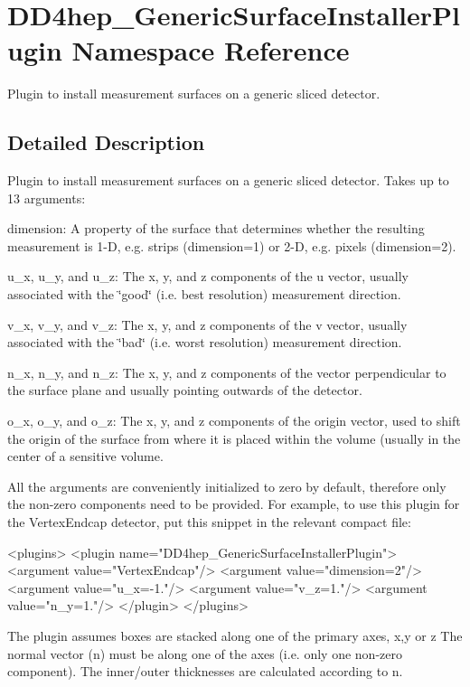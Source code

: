 \hypertarget{namespace_d_d4hep___generic_surface_installer_plugin}{
\section{DD4hep\_\-GenericSurfaceInstallerPlugin Namespace Reference}
\label{namespace_d_d4hep___generic_surface_installer_plugin}
}


Plugin to install measurement surfaces on a generic sliced detector.  


\subsection{Detailed Description}
Plugin to install measurement surfaces on a generic sliced detector. Takes up to 13 arguments:
\begin{DoxyItemize}
\item {\ttfamily dimension:} A property of the surface that determines whether the resulting measurement is 1-\/D, e.g. strips ({\ttfamily dimension=1}) or 2-\/D, e.g. pixels ({\ttfamily dimension=2}).
\item {\ttfamily u\_\-x}, {\ttfamily u\_\-y}, and {\ttfamily u\_\-z:} The x, y, and z components of the u vector, usually associated with the \char`\"{}good\char`\"{} (i.e. best resolution) measurement direction.
\item {\ttfamily v\_\-x}, {\ttfamily v\_\-y}, and {\ttfamily v\_\-z:} The x, y, and z components of the v vector, usually associated with the \char`\"{}bad\char`\"{} (i.e. worst resolution) measurement direction.
\item {\ttfamily n\_\-x}, {\ttfamily n\_\-y}, and {\ttfamily n\_\-z:} The x, y, and z components of the vector perpendicular to the surface plane and usually pointing outwards of the detector.
\item {\ttfamily o\_\-x}, {\ttfamily o\_\-y}, and {\ttfamily o\_\-z:} The x, y, and z components of the origin vector, used to shift the origin of the surface from where it is placed within the volume (usually in the center of a sensitive volume.
\end{DoxyItemize}

All the arguments are conveniently initialized to zero by default, therefore only the non-\/zero components need to be provided. For example, to use this plugin for the VertexEndcap detector, put this snippet in the relevant compact file: \begin{DoxyVerb}
<plugins>
      <plugin name="DD4hep_GenericSurfaceInstallerPlugin">
          <argument value="VertexEndcap"/>
          <argument value="dimension=2"/>
          <argument value="u_x=-1."/>
          <argument value="v_z=1."/>
          <argument value="n_y=1."/>
      </plugin>
</plugins>
\end{DoxyVerb}
 The plugin assumes boxes are stacked along one of the primary axes, x,y or z The normal vector (n) must be along one of the axes (i.e. only one non-\/zero component). The inner/outer thicknesses are calculated according to n.

